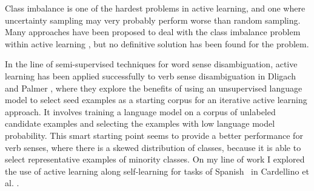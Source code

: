 Class imbalance is one of the hardest problems in active learning, and one
where uncertainty sampling may very probably perform worse than random
sampling. Many approaches have been proposed to deal with the class imbalance
problem within active learning
\cite{Tomanek:2009:RCI:1597735.1597754,bloodgood2009taking,zhu2007active,Ertekin07learningon,conf/nips/HeC07},
but no definitive solution has been found for the problem.

In the line of semi-supervised techniques for word sense disambiguation, active
learning has been applied successfully to verb sense disambiguation in Dligach
and Palmer \cite{dligach2011good}, where they explore the benefits of using an
unsupervised language model to select seed examples as a starting corpus for an
iterative active learning approach. It involves training a language model on a
corpus of unlabeled candidate examples and selecting the examples with low
language model probability. This smart starting point seems to provide a better
performance for verb senses, where there is a skewed distribution of classes,
because it is able to select representative examples of minority classes. On
my line of work I explored the use of active learning along self-learning for
tasks of Spanish \vsd~in Cardellino et al. \cite{Cardellino2015Workshop}.
